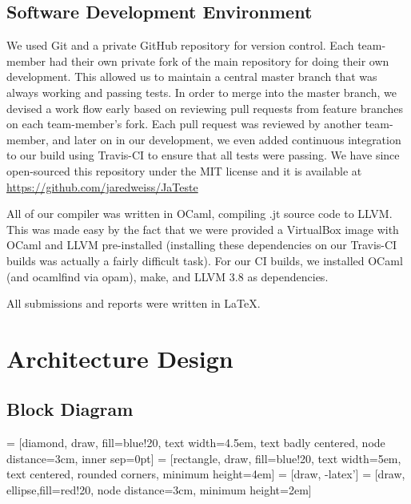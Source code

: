\documentclass{article}
\begin{document}
\subsection{Software Development Environment}
We used Git and a private GitHub repository for version control. Each team-member had their own private fork of the main repository for doing their own development. This allowed us to maintain a central master branch that was always working and passing tests. In order to merge into the master branch, we devised a work flow early based on reviewing pull requests from feature branches on each team-member's fork. Each pull request was reviewed by another team-member, and later on in our development, we even added continuous integration to our build using Travis-CI to ensure that all tests were passing.
We have since open-sourced this repository under the MIT license and it is available at \url{https://github.com/jaredweiss/JaTeste}

All of our compiler was written in OCaml, compiling .jt source code to LLVM. This was made easy by the fact that we were provided a VirtualBox image with OCaml and LLVM pre-installed (installing these dependencies on our Travis-CI builds was actually a fairly difficult task). For our CI builds, we installed OCaml (and ocamlfind via opam), make, and LLVM 3.8 as dependencies. 

All submissions and reports were written in \LaTeX.

\newpage

\section{Architecture Design}

\subsection{Block Diagram}
 = [diamond, draw, fill=blue!20, 
    text width=4.5em, text badly centered, node distance=3cm, inner sep=0pt]
 = [rectangle, draw, fill=blue!20, 
    text width=5em, text centered, rounded corners, minimum height=4em]
 = [draw, -latex']
 = [draw, ellipse,fill=red!20, node distance=3cm,
    minimum height=2em]
    
\end{document}
